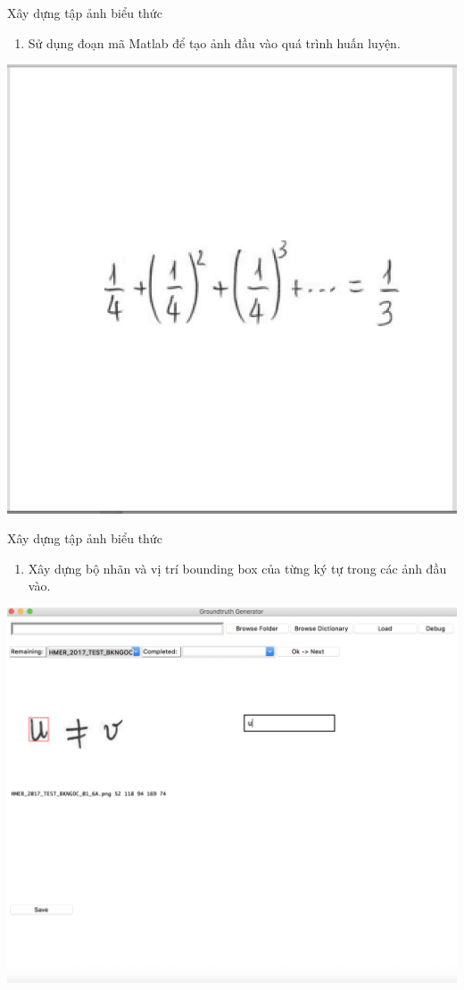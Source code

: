 \documentclass{beamer}
\newcounter{saveenumi}
\newcommand{\seti}{\setcounter{saveenumi}{\value{enumi}}}
\newcommand{\conti}{\setcounter{enumi}{\value{saveenumi}}}
\begin{document}
	\begin{frame}{Xây dựng tập ảnh biểu thức}
	\begin{enumerate}
		\conti
		\item Sử dụng đoạn mã Matlab để tạo ảnh đầu vào quá trình huấn luyện.
		\seti
	\end{enumerate}
		\begin{center}
		\centering
		\includegraphics[width=0.45\linewidth]{EXP_2017_072_2A.png}
		\vspace{0.5cm}
	\end{center}
	\end{frame}
	
	\begin{frame}{Xây dựng tập ảnh biểu thức}
		\begin{enumerate}
			\conti
			\item Xây dựng bộ nhãn và vị trí bounding box của từng ký tự trong các ảnh đầu vào.
		\end{enumerate}
		\begin{center}
			\centering
			\includegraphics[width=0.5\linewidth]{tool}
			\vspace{0.5cm}
		\end{center}
	\end{frame}
\end{document}
